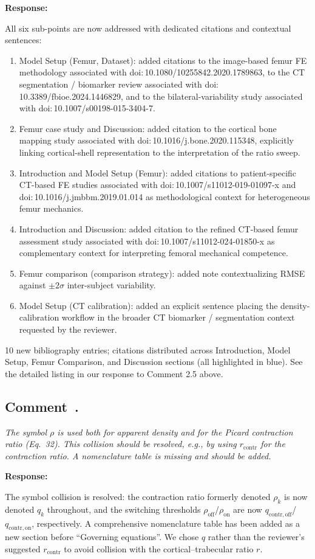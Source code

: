 \documentclass[11pt,a4paper]{article}
\newcounter{reviewer}
\newcounter{comment}[reviewer]
\newcommand{\revcomment}[1]{%
  \refstepcounter{comment}%
  \subsection*{Comment~\thereviewer.\thecomment}%
  {\color{reviewerblue}\itshape #1}%
  \medskip
}
\newcommand{\response}{%
  \par\noindent\textbf{Response:}\par\noindent\color{responseblack}%
}
\newcommand{\change}{%
  \par\noindent{\color{blue}\textbf{Change in manuscript:}}\par\noindent\color{blue}%
}
\begin{document}
\response
All six sub-points are now addressed with dedicated citations and contextual sentences:
\begin{enumerate}[nosep]
\item Model Setup (Femur, Dataset): added citations to the image-based femur FE methodology associated with doi:\,10.1080/10255842.2020.1789863, to the CT segmentation / biomarker review associated with doi:\,10.3389/fbioe.2024.1446829, and to the bilateral-variability study associated with doi:\,10.1007/s00198-015-3404-7.
\item Femur case study and Discussion: added citation to the cortical bone mapping study associated with doi:\,10.1016/j.bone.2020.115348, explicitly linking cortical-shell representation to the interpretation of the ratio sweep.
\item Introduction and Model Setup (Femur): added citations to patient-specific CT-based FE studies associated with doi:\,10.1007/s11012-019-01097-x and doi:\,10.1016/j.jmbbm.2019.01.014 as methodological context for heterogeneous femur mechanics.
\item Introduction and Discussion: added citation to the refined CT-based femur assessment study associated with doi:\,10.1007/s11012-024-01850-x as complementary context for interpreting femoral mechanical competence.
\item Femur comparison (comparison strategy): added note contextualizing RMSE against $\pm2\sigma$ inter-subject variability.
\item Model Setup (CT calibration): added an explicit sentence placing the density-calibration workflow in the broader CT biomarker / segmentation context requested by the reviewer.
\end{enumerate}

\change
10 new bibliography entries; citations distributed across Introduction, Model Setup, Femur Comparison, and Discussion sections (all highlighted in blue). See the detailed listing in our response to Comment 2.5 above.


\revcomment{The symbol $\rho$ is used both for apparent density and for the Picard contraction ratio (Eq.~32). This collision should be resolved, e.g., by using $r_{\mathrm{contr}}$ for the contraction ratio. A nomenclature table is missing and should be added.}

\response
The symbol collision is resolved: the contraction ratio formerly denoted $\rho_k$ is now denoted $q_k$ throughout, and the switching thresholds $\rho_{\mathrm{off}}$/$\rho_{\mathrm{on}}$ are now $q_{\mathrm{contr,off}}$/$q_{\mathrm{contr,on}}$, respectively. A comprehensive nomenclature table has been added as a new section before ``Governing equations''. We chose $q$ rather than the reviewer's suggested $r_{\mathrm{contr}}$ to avoid collision with the cortical--trabecular ratio $r$.
\end{document}
